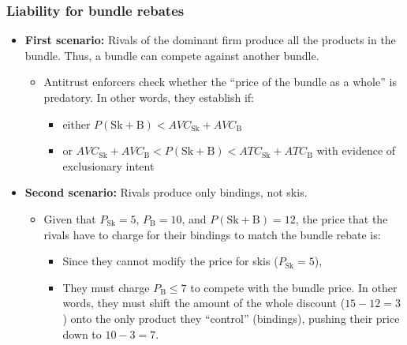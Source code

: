         \subsubsection{Liability for bundle rebates}

            \begin{itemize}
                \item \textbf{First scenario:} Rivals of the dominant firm produce all the products in the bundle. Thus, a bundle can compete against another bundle.
                \begin{itemize}
                    \item Antitrust enforcers check whether the “price of the bundle as a whole” is predatory. In other words, they establish if:
                    \begin{itemize}
                        \item either \( P(\text{Sk} + \text{B}) < AVC_{\text{Sk}} + AVC_{\text{B}} \)
                        \item or \( AVC_{\text{Sk}} + AVC_{\text{B}} < P(\text{Sk} + \text{B}) < ATC_{\text{Sk}} + ATC_{\text{B}} \) with evidence of exclusionary intent
                    \end{itemize}
                \end{itemize}
                \item \textbf{Second scenario:} Rivals produce only bindings, not skis.
                \begin{itemize}
                    \item Given that \( P_{\text{Sk}} = 5 \), \( P_{\text{B}} = 10 \), and \( P(\text{Sk} + \text{B}) = 12 \), the price that the rivals have to charge for their bindings to match the bundle rebate is:
                    \begin{itemize}
                        \item Since they cannot modify the price for skis (\( P_{\text{Sk}} = 5 \)),
                        \item They must charge \( P_{\text{B}} \leq 7 \) to compete with the bundle price. In other words, they must shift the amount of the whole discount (\( 15 - 12 = 3 \)) onto the only product they “control” (bindings), pushing their price down to \( 10 - 3 = 7 \).
                    \end{itemize}
                \end{itemize}
            \end{itemize}


